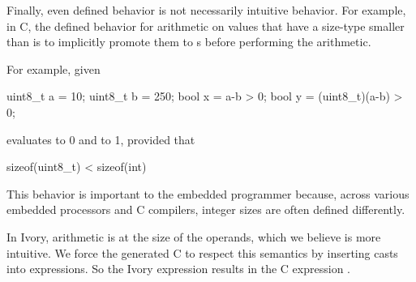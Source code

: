 Finally, even defined behavior is not necessarily intuitive behavior.  For
example, in C, the defined behavior for arithmetic on values that have a
size-type smaller than  is to implicitly promote them to s before
performing the arithmetic.

For example, given
\begin{code}
uint8\_t a = 10;
uint8\_t b = 250;
bool    x = a-b > 0;
bool    y = (uint8\_t)(a-b) > 0;
\end{code}
\noindent
{} evaluates to 0 and  to 1, provided that
\begin{code}
sizeof(uint8\_t) < sizeof(int)
\end{code}
\noindent
This behavior is important to the embedded programmer because, across various
embedded processors and C compilers, integer sizes are often defined
differently.

In Ivory, arithmetic is at the size of the operands, which we believe is more
intuitive.  We force the generated C to respect this semantics by inserting
casts into expressions.  So the Ivory expression  results in the C
expression .




